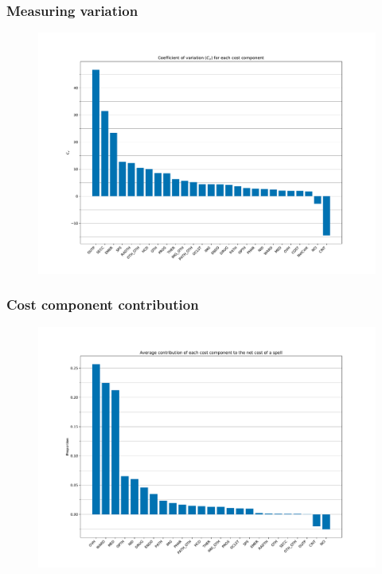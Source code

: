 \documentclass{beamer}
\begin{document}
\begin{frame}
    \frametitle{Measuring variation}

    \begin{figure}
        \includegraphics[width=\linewidth]{./img/coeff_variation.pdf}
    \end{figure}
\end{frame}

\begin{frame}
    \frametitle{Cost component contribution}

    \begin{figure}
        \includegraphics[width=\linewidth]{./img/cost_contribution.pdf}
    \end{figure}
\end{frame}
\end{document}
